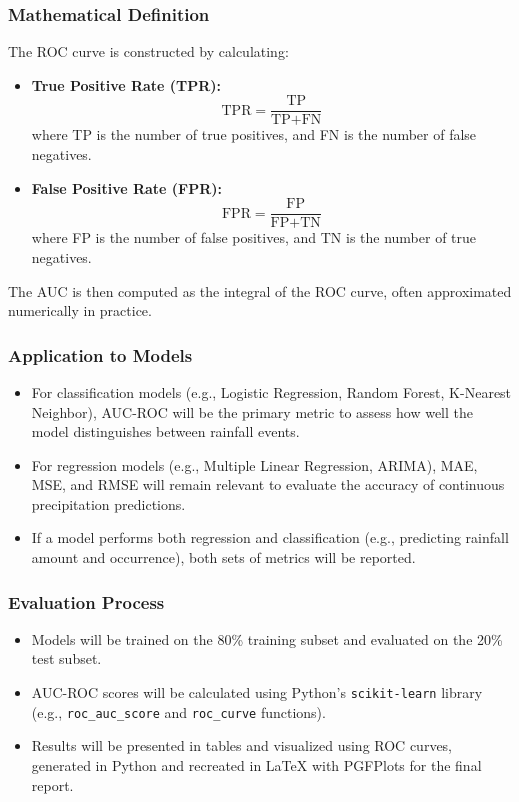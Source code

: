 \documentclass[12pt]{article}
\begin{document}
\subsubsection{Mathematical Definition}
The ROC curve is constructed by calculating:
\begin{itemize}
    \item \textbf{True Positive Rate (TPR):} \[ \text{TPR} = \frac{\text{TP}}{\text{TP} + \text{FN}} \] where TP is the number of true positives, and FN is the number of false negatives.
    \item \textbf{False Positive Rate (FPR):} \[ \text{FPR} = \frac{\text{FP}}{\text{FP} + \text{TN}} \] where FP is the number of false positives, and TN is the number of true negatives.
\end{itemize}
The AUC is then computed as the integral of the ROC curve, often approximated numerically in practice.

\subsubsection{Application to Models}
\begin{itemize}
    \item For classification models (e.g., Logistic Regression, Random Forest, K-Nearest Neighbor), AUC-ROC will be the primary metric to assess how well the model distinguishes between rainfall events.
    \item For regression models (e.g., Multiple Linear Regression, ARIMA), MAE, MSE, and RMSE will remain relevant to evaluate the accuracy of continuous precipitation predictions.
    \item If a model performs both regression and classification (e.g., predicting rainfall amount and occurrence), both sets of metrics will be reported.
\end{itemize}

\subsubsection{Evaluation Process}
\begin{itemize}
    \item Models will be trained on the 80\% training subset and evaluated on the 20\% test subset.
    \item AUC-ROC scores will be calculated using Python’s \texttt{scikit-learn} library (e.g., \texttt{roc\_auc\_score} and \texttt{roc\_curve} functions).
    \item Results will be presented in tables and visualized using ROC curves, generated in Python and recreated in LaTeX with PGFPlots for the final report.
\end{itemize}
\end{document}
